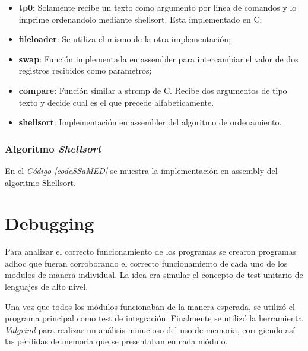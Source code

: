 \documentclass{article}
\newcommand{\refcode}[1]{\textit{Código \ref{#1}}}
\begin{document}
\begin{itemize}

\itemsep=2pt \topsep=0pt \partopsep=0pt \parskip=0pt \parsep=0pt
	\item \textbf{tp0}: Solamente recibe un texto como argumento por linea de comandos y lo imprime ordenandolo mediante shellsort. Esta implementado en C;
	\item \textbf{fileloader}: Se utiliza el mismo de la otra implementación;
	\item \textbf{swap}: Función implementada en assembler para intercambiar el valor de dos registros recibidos como parametros;
	\item \textbf{compare}: Función similar a strcmp de C. Recibe dos argumentos de tipo texto y decide cual es el que precede alfabeticamente.
	\item \textbf{shellsort}: Implementación en assembler del algoritmo de ordenamiento.

\end{itemize}	
\medskip




\subsubsection{Algoritmo \textit{Shellsort}}

	En el \refcode{codeSSaMED} se muestra la implementación en assembly del algoritmo Shellsort.

%  




\section{Debugging}
	
	Para analizar el correcto funcionamiento de los programas se crearon programas adhoc que fueran corroborando el correcto funcionamiento de cada uno de los modulos de manera individual. La idea era simular el concepto de test unitario de lenguajes de alto nivel.
	\par
	Una vez que todos los módulos funcionaban de la manera esperada, se utilizó el programa principal como test de integración.
Finalmente se utilizó la herramienta \textit{Valgrind} para realizar un análisis minucioso del uso de memoria, corrigiendo así las pérdidas de memoria que se presentaban en cada módulo.
\bigskip
\end{document}
